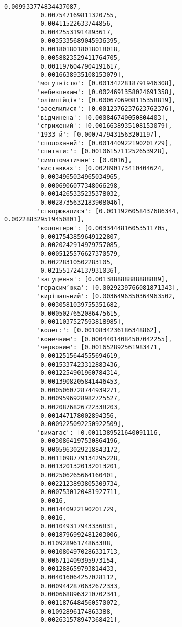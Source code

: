 \documentclass[11pt]{article}
\begin{document}
\begin{Verbatim}[commandchars=\\\{\}]
          0.009933774834437087,
          0.007547169811320755,
          0.00411522633744856,
          0.00425531914893617,
          0.0035335689045936395,
          0.0018018018018018018,
          0.0058823529411764705,
          0.0011976047904191617,
          0.0016638935108153079],
         'могутністю': [0.0013422818791946308],
         'небезпекам': [0.0024691358024691358],
         'олімпійців': [0.0006706908115358819],
         'заселилися': [0.0012376237623762376],
         'відчинена': [0.000846740050804403],
         'стрижений': [0.0016638935108153079],
         '1933-й': [0.0007479431563201197],
         'сполоханий': [0.001440922190201729],
         'спитати:': [0.0010615711252653928],
         'симптоматичне': [0.0016],
         'виставках': [0.002890173410404624,
          0.0034965034965034965,
          0.0006906077348066298,
          0.0014265335235378032,
          0.0028735632183908046],
         'створювалися': [0.0011926058437686344, 0.002288329519450801],
         'волонтери': [0.0033444816053511705,
          0.0017543859649122807,
          0.0020242914979757085,
          0.0005125576627370579,
          0.00228310502283105,
          0.021551724137931036],
         'загущення': [0.001388888888888889],
         'герасим’юка': [0.0029239766081871343],
         'вирішальний': [0.0036496350364963502,
          0.0030581039755351682,
          0.0005027652086475615,
          0.0011037527593818985],
         'колег:': [0.0010834236186348862],
         'конечним': [0.00044014084507042255],
         'червоним': [0.001652892561983471,
          0.0012515644555694619,
          0.0015337423312883436,
          0.0012254901960784314,
          0.0013908205841446453,
          0.0005060728744939271,
          0.0009596928982725527,
          0.0020876826722338203,
          0.001447178002894356,
          0.0009225092250922509],
         'вимагає': [0.0011389521640091116,
          0.0030864197530864196,
          0.0005963029218843172,
          0.0011098779134295228,
          0.0013201320132013201,
          0.002506265664160401,
          0.0022123893805309734,
          0.0007530120481927711,
          0.0016,
          0.001440922190201729,
          0.0016,
          0.001049317943336831,
          0.0018796992481203006,
          0.01092896174863388,
          0.0010804970286331713,
          0.006711409395973154,
          0.001288659793814433,
          0.004016064257028112,
          0.0009442870632672333,
          0.0006688963210702341,
          0.0011876484560570072,
          0.01092896174863388,
          0.002631578947368421],

\end{Verbatim}
\end{document}
